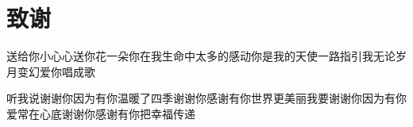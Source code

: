 \section*{\heiti{}\bfseries 致\qquad 谢}

送给你小心心送你花一朵你在我生命中太多的感动你是我的天使一路指引我无论岁月变幻爱你唱成歌

听我说谢谢你因为有你温暖了四季谢谢你感谢有你世界更美丽我要谢谢你因为有你爱常在心底谢谢你感谢有你把幸福传递
